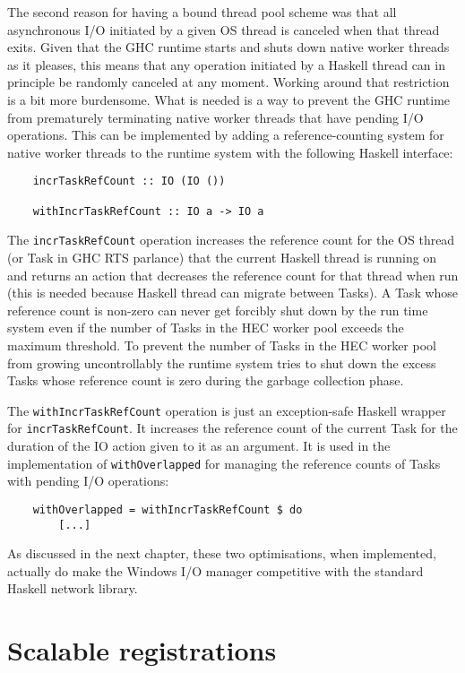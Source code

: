 \documentclass[a4paper,11pt,oneside]{report}
\begin{document}
The second reason for having a bound thread pool scheme was that all
asynchronous I/O initiated by a given OS thread is canceled when that thread
exits. Given that the GHC runtime starts and shuts down native worker threads as
it pleases, this means that any operation initiated by a Haskell thread can in
principle be randomly canceled at any moment. Working around that restriction is
a bit more burdensome. What is needed is a way to prevent the GHC runtime from
prematurely terminating native worker threads that have pending I/O
operations. This can be implemented by adding a reference-counting system for
native worker threads to the runtime system with the following Haskell
interface:

\begin{verbatim}
    incrTaskRefCount :: IO (IO ())

    withIncrTaskRefCount :: IO a -> IO a
\end{verbatim}

The \texttt{incrTaskRefCount} operation increases the reference count for the OS
thread (or Task in GHC RTS parlance) that the current Haskell thread is running
on and returns an action that decreases the reference count for that thread when
run (this is needed because Haskell thread can migrate between Tasks). A Task
whose reference count is non-zero can never get forcibly shut down by the run
time system even if the number of Tasks in the HEC worker pool exceeds the
maximum threshold. To prevent the number of Tasks in the HEC worker pool from
growing uncontrollably the runtime system tries to shut down the excess Tasks
whose reference count is zero during the garbage collection phase.

The \texttt{withIncrTaskRefCount} operation is just an exception-safe Haskell
wrapper for \texttt{incrTaskRefCount}. It increases the reference count of the
current Task for the duration of the IO action given to it as an argument. It is
used in the implementation of \texttt{withOverlapped} for managing the reference
counts of Tasks with pending I/O operations:

\begin{verbatim}
    withOverlapped = withIncrTaskRefCount $ do
        [...]
\end{verbatim}

As discussed in the next chapter, these two optimisations, when implemented,
actually do make the Windows I/O manager competitive with the standard Haskell
network library.

\section{Scalable registrations}
\end{document}

